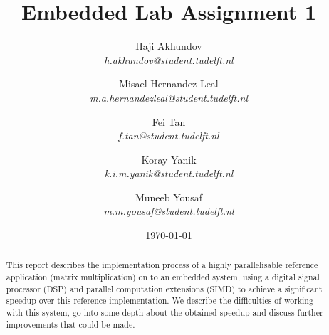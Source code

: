 \documentclass[a4paper,10pt]{article}
\title{Embedded Lab Assignment 1}
\author{
Haji Akhundov\\ \small{\textit{h.akhundov@student.tudelft.nl}} \and
Misael Hernandez Leal\\ \small{\textit{m.a.hernandezleal@student.tudelft.nl}} \and
Fei Tan\\ \small{\textit{f.tan@student.tudelft.nl}} \and
Koray Yanik\\ \small{\textit{k.i.m.yanik@student.tudelft.nl}} \and
Muneeb Yousaf\\ \small{\textit{m.m.yousaf@student.tudelft.nl}}
}
\date{\today}
\begin{document}
\maketitle

\nocite{*}

\begin{abstract}
This report describes the implementation process of a highly parallelisable 
reference application (matrix multiplication) on to an embedded system, using 
a digital signal processor (DSP) and parallel computation extensions (SIMD) to 
achieve a significant speedup over this reference implementation. We describe
the difficulties of working with this system, go into some depth about the 
obtained speedup and discuss further improvements that could be made.

\end{abstract}













{}

\end{document}
